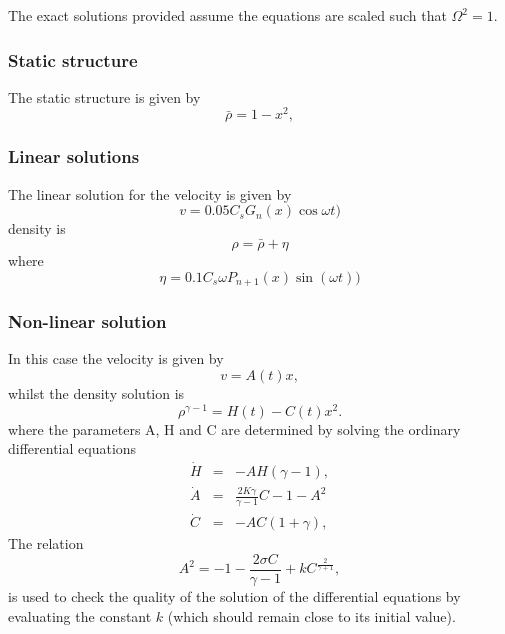 \documentclass[a4paper,12pt]{article}
\begin{document}
 The exact solutions provided assume the equations are scaled such that
$\Omega^2 = 1$.
 
\subsubsection{Static structure}
The static structure is given by
\begin{equation}
\bar \rho = 1- x^2,
\end{equation}

\subsubsection{Linear solutions}
The linear solution for the velocity is given by
\begin{equation}
v = 0.05 C_s G_n(x) \cos{\omega t} )
\end{equation}
density is
\begin{equation}
\rho = \bar{\rho} + \eta
\end{equation}
where 
\begin{equation}
\eta = 0.1 C_s \omega P_{n+1}(x) \sin{(\omega t)})
\end{equation}

\subsubsection{Non-linear solution}
In this case the velocity is given by
\begin{equation}
v = A(t) x,
\end{equation}
whilst the density solution is
\begin{equation}
\rho^{\gamma -1} = H(t) - C(t) x^2.
\end{equation}
where the parameters A, H and C are determined by solving the ordinary
differential equations
\begin{eqnarray}
\dot{H} & = & -AH(\gamma -1), \\
\dot{A} & = & \frac{2K \gamma}{\gamma -1} C - 1 - A^2 \\
\dot{C} & = & -AC(1+ \gamma),
\end{eqnarray}
The relation
\begin{equation}
A^2 = -1 - \frac{2 \sigma C}{\gamma -1} + kC^{\frac{2}{\gamma +1}},
\label{eq:kconst}
\end{equation}
is used to check the quality of the solution of the differential equations by
evaluating the constant $k$ (which should remain close to its initial value).
\end{document}
